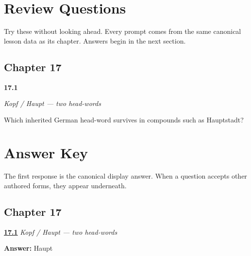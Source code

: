 
\chapter*{Review Questions}

Try these without looking ahead. Every prompt comes from the same canonical lesson data as its chapter. Answers begin in the next section.

\section*{Chapter 17}

\noindent\begin{minipage}[t]{\linewidth}
\raggedright
\hypertarget{review-GE-C17-kopf-haupt-compound-word}{\textbf{17.1}} \emph{Kopf / Haupt — two head-words}\par
\small Which inherited German head-word survives in compounds such as Hauptstadt?
\end{minipage}\par\medskip

\chapter*{Answer Key}

The first response is the canonical display answer. When a question accepts other authored forms, they appear underneath.

\section*{Chapter 17}

\noindent\begin{minipage}[t]{\linewidth}
\raggedright
\hyperlink{review-GE-C17-kopf-haupt-compound-word}{\textbf{17.1}} \emph{Kopf / Haupt — two head-words}\par
\small \textbf{Answer:} Haupt\par
\end{minipage}\par\medskip
